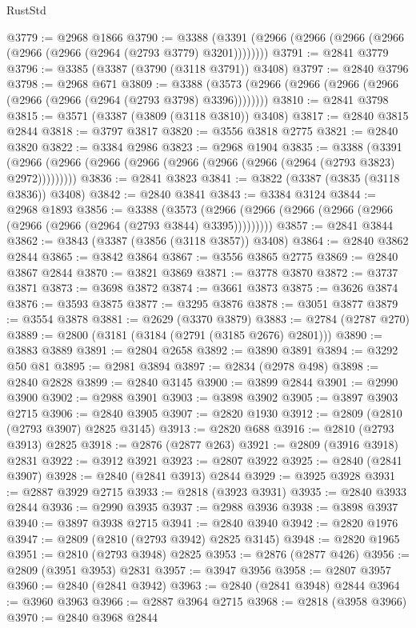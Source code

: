 \begin{lexlean}{RustStd}
\begin{coremodule}
{\begin{coremodule}
{{{{{{{{{{{{{{{{{{{{{{{{{{{{{{{{{@3779 := @2968 @1866
@3790 := @3388 (@3391 (@2966 (@2966 (@2966 (@2966 (@2966 (@2966 (@2964 (@2793 @3779) @3201))))))))
@3791 := @2841 @3779
@3796 := @3385 (@3387 (@3790 (@3118 @3791)) @3408)
@3797 := @2840 @3796
@3798 := @2968 @671
@3809 := @3388 (@3573 (@2966 (@2966 (@2966 (@2966 (@2966 (@2966 (@2964 (@2793 @3798) @3396))))))))
@3810 := @2841 @3798
@3815 := @3571 (@3387 (@3809 (@3118 @3810)) @3408)
@3817 := @2840 @3815 @2844
@3818 := @3797 @3817
@3820 := @3556 @3818 @2775
@3821 := @2840 @3820
@3822 := @3384 @2986
@3823 := @2968 @1904
@3835 := @3388
    (@3391 (@2966 (@2966 (@2966 (@2966 (@2966 (@2966 (@2966 (@2964 (@2793 @3823) @2972)))))))))
@3836 := @2841 @3823
@3841 := @3822 (@3387 (@3835 (@3118 @3836)) @3408)
@3842 := @2840 @3841
@3843 := @3384 @3124
@3844 := @2968 @1893
@3856 := @3388
    (@3573 (@2966 (@2966 (@2966 (@2966 (@2966 (@2966 (@2966 (@2964 (@2793 @3844) @3395)))))))))
@3857 := @2841 @3844
@3862 := @3843 (@3387 (@3856 (@3118 @3857)) @3408)
@3864 := @2840 @3862 @2844
@3865 := @3842 @3864
@3867 := @3556 @3865 @2775
@3869 := @2840 @3867 @2844
@3870 := @3821 @3869
@3871 := @3778 @3870
@3872 := @3737 @3871
@3873 := @3698 @3872
@3874 := @3661 @3873
@3875 := @3626 @3874
@3876 := @3593 @3875
@3877 := @3295 @3876
@3878 := @3051 @3877
@3879 := @3554 @3878
@3881 := @2629 (@3370 @3879)
@3883 := @2784 (@2787 @270)
@3889 := @2800 (@3181 (@3184 (@2791 (@3185 @2676) @2801)))
@3890 := @3883 @3889
@3891 := @2804 @2658
@3892 := @3890 @3891
@3894 := @3292 @50 @81
@3895 := @2981 @3894
@3897 := @2834 (@2978 @498)
@3898 := @2840 @2828
@3899 := @2840 @3145
@3900 := @3899 @2844
@3901 := @2990 @3900
@3902 := @2988 @3901
@3903 := @3898 @3902
@3905 := @3897 @3903 @2715
@3906 := @2840 @3905
@3907 := @2820 @1930
@3912 := @2809 (@2810 (@2793 @3907) @2825 @3145)
@3913 := @2820 @688
@3916 := @2810 (@2793 @3913) @2825
@3918 := @2876 (@2877 @263)
@3921 := @2809 (@3916 @3918) @2831
@3922 := @3912 @3921
@3923 := @2807 @3922
@3925 := @2840 (@2841 @3907)
@3928 := @2840 (@2841 @3913) @2844
@3929 := @3925 @3928
@3931 := @2887 @3929 @2715
@3933 := @2818 (@3923 @3931)
@3935 := @2840 @3933 @2844
@3936 := @2990 @3935
@3937 := @2988 @3936
@3938 := @3898 @3937
@3940 := @3897 @3938 @2715
@3941 := @2840 @3940
@3942 := @2820 @1976
@3947 := @2809 (@2810 (@2793 @3942) @2825 @3145)
@3948 := @2820 @1965
@3951 := @2810 (@2793 @3948) @2825
@3953 := @2876 (@2877 @426)
@3956 := @2809 (@3951 @3953) @2831
@3957 := @3947 @3956
@3958 := @2807 @3957
@3960 := @2840 (@2841 @3942)
@3963 := @2840 (@2841 @3948) @2844
@3964 := @3960 @3963
@3966 := @2887 @3964 @2715
@3968 := @2818 (@3958 @3966)
@3970 := @2840 @3968 @2844
}}}}}}}}}}}}}}}}}}}}}}}}}}}}}}}}}
\end{coremodule}}
\end{coremodule}
\end{lexlean}
